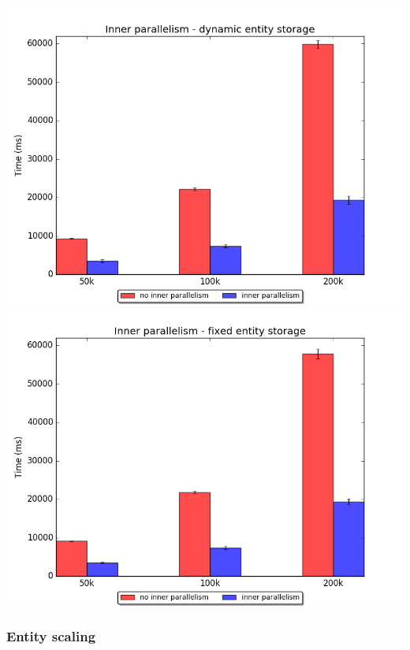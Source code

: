 \documentclass[oneside, 12pt, a4paper, openany]{book}
\begin{document}
\includegraphics{source/figures/bench/ipcomp_dynamic.png}
\includegraphics{source/figures/bench/ipcomp_fixed.png}

\subsubsection{Entity scaling}\label{entity-scaling}
\end{document}
